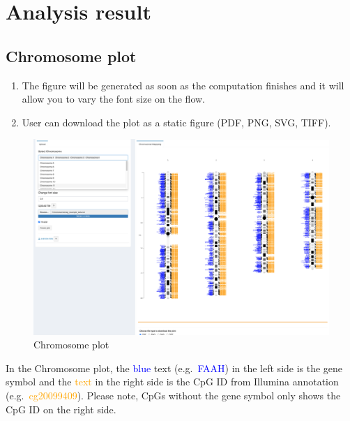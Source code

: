\documentclass[
  a4paper,
  oneside,
  open=any]{scrreport}
\providecommand{\tightlist}{%
  \setlength{\itemsep}{0pt}\setlength{\parskip}{0pt}}\usepackage{longtable,booktabs,array}
\begin{document}
\hypertarget{analysis-result-3}{%
\section{Analysis result}\label{analysis-result-3}}

\hypertarget{chromosome-plot}{%
\subsection{Chromosome plot}\label{chromosome-plot}}

\begin{enumerate}
\def\labelenumi{\arabic{enumi}.}
\tightlist
\item
  The figure will be generated as soon as the computation finishes and
  it will allow you to vary the font size on the flow.
\item
  User can download the plot as a static figure (PDF, PNG, SVG, TIFF).\\
\end{enumerate}

\begin{figure}[H]

{\centering \includegraphics{./_images/chromosome1.png}

}

\caption{Chromosome plot}

\end{figure}

\begin{tcolorbox}[enhanced jigsaw, left=2mm, colback=white, breakable, leftrule=.75mm, coltitle=black, toprule=.15mm, rightrule=.15mm, colbacktitle=quarto-callout-note-color!10!white, title=\textcolor{quarto-callout-note-color}{\faInfo}\hspace{0.5em}{Note}, opacitybacktitle=0.6, colframe=quarto-callout-note-color-frame, bottomrule=.15mm, bottomtitle=1mm, toptitle=1mm, titlerule=0mm, opacityback=0, arc=.35mm]
In the Chromosome plot, the \textcolor{blue}{blue} text
(e.g.~\textcolor{blue}{FAAH}) in the left side is the gene symbol and
the \textcolor{orange}{text} in the right side is the CpG ID from
Illumina annotation (e.g.~\textcolor{orange}{cg20099409}). Please note,
CpGs without the gene symbol only shows the CpG ID on the right side.
\end{tcolorbox}
\end{document}
